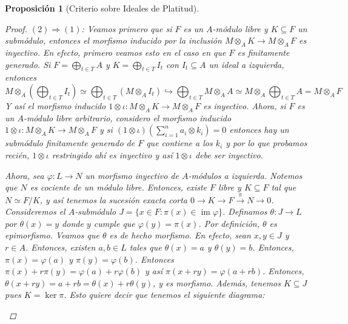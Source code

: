 \documentclass[12pt]{book}
\newtheorem{prop}[teo]{Proposición}
\theoremstyle{definition}
\DeclareMathOperator{\im}{im}
\begin{document}
\begin{prop}[Criterio sobre Ideales de Platitud]
\begin{proof}
$(2)\Longrightarrow (1)$: Veamos primero que si $F$ es un $A$-módulo libre y $K\subseteq F$ un submódulo, entonces el morfismo inducido por la inclusión $M\otimes_A K\to M\otimes_A F$ es inyectivo. En efecto, primero veamos esto en el caso en que $F$ es finitamente generado. Si $F=\displaystyle\bigoplus_{t\in T}A$ y $K = \displaystyle\bigoplus_{t\in T}I_t$ con $I_t\subseteq A$ un ideal a izquierda, entonces $$M\otimes_A \left(\displaystyle\bigoplus_{t\in T} I_t\right) \simeq \bigoplus_{t\in T}(M\otimes_A I_t) \hookrightarrow \bigoplus_{t\in T}M\otimes_A A\simeq M\otimes_A \bigoplus_{t\in T}A = M\otimes_A F$$ Y así el morfismo inducido $1\otimes \iota:M\otimes_A K\to M\otimes_A F$ es inyectivo. Ahora, si $F$ es un $A$-módulo libre arbitrario, considero el morfismo inducido $1\otimes\iota:M\otimes_A K\to M\otimes_A F$ y si $(1\otimes \iota)\left(\displaystyle\sum_{i=1}^n a_i\otimes k_i\right) = 0$ entonces hay un submódulo finitamente generado de $F$ que contiene a los $k_i$ y por lo que probamos recién, $1\otimes \iota$ restringido ahí es inyectivo y así $1\otimes \iota$ debe ser inyectivo. 

Ahora, sea $\varphi:L\to N$ un morfismo inyectivo de $A$-módulos a izquierda. Notemos que $N$ es cociente de un módulo libre. Entonces, existe $F$ libre y $K\subseteq F$ tal que $N\simeq F/K$, y así tenemos la sucesión exacta corta $0\longrightarrow K\longrightarrow F\stackrel{\pi}{\longrightarrow}N\longrightarrow 0$. Consideremos el $A$-submódulo $J=\{x\in F : \pi(x) \in \im \varphi\}$. Definamos $\theta:J\to L$ por $\theta(x)=y$ donde $y$ cumple que $\varphi(y) = \pi(x)$. Por definición, $\theta$ es epimorfismo. Veamos que $\theta$ es de hecho morfismo. En efecto, sean $x,y\in J$ y $r\in A$. Entonces, existen $a,b\in L$ tales que $\theta(x)=a$ y $\theta(y)=b$. Entonces, $\pi(x) = \varphi(a)$ y $\pi(y)= \varphi(b)$. Entonces $\pi(x) + r\pi(y) = \varphi(a) + r\varphi(b)$ y así $\pi(x+ry) = \varphi(a+rb)$. Entonces, $\theta(x+ry)=a+rb = \theta(x) + r\theta(y)$, y es morfismo. Además, tenemos $K\subseteq J$ pues $K=\ker \pi$. Esto quiere decir que tenemos el siguiente diagrama:

\begin{center}\end{center}


\end{proof}
\end{prop}
\end{document}
